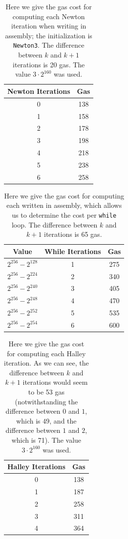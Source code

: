 \begin{table}[p]
\centering
\begin{tabular}{|c|S[table-format=3.0]|}
\hline
Newton Iterations & Gas \\
 & 138 \\
1 & 158 \\
2 & 178 \\
3 & 198 \\
4 & 218 \\
5 & 238 \\
6 & 258 \\
\hline
\end{tabular}
\caption[Newton Iteration Gas Costs]{Here we give
    the gas cost for computing each Newton iteration
    when writing in assembly;
    the initialization is \texttt{Newton3}.
    The difference between $k$ and $k+1$ iterations is 20 gas.
    The value $3\cdot2^{160}$ was used.
    }
\label{table:newton_iteration_gas_costs}
\end{table}

\begin{table}[p]
\centering
\begin{tabular}{|c|c|S[table-format=3.0]|}
\hline
Value & While Iterations & Gas \\
\hline
$2^{256} - 2^{128}$ & 1 & 275 \\
$2^{256} - 2^{224}$ & 2 & 340 \\
$2^{256} - 2^{240}$ & 3 & 405 \\
$2^{256} - 2^{248}$ & 4 & 470 \\
$2^{256} - 2^{252}$ & 5 & 535 \\
$2^{256} - 2^{254}$ & 6 & 600 \\
\hline
\end{tabular}
\caption[While Iteration Gas Costs]{Here we give
    the gas cost for computing each \WhileTwo{}
    written in assembly,
    which allows us to determine the cost per \texttt{while} loop.
    The difference between $k$ and $k+1$ iterations is 65 gas.
    }
\label{table:while_iteration_gas_costs}
\end{table}

\begin{table}[p]
\centering
\begin{tabular}{|c|S[table-format=3.0]|}
\hline
Halley Iterations & Gas \\
 & 138 \\
1 & 187 \\
2 & 258 \\
3 & 311 \\
4 & 364 \\
\hline
\end{tabular}
\caption[Halley Iteration Gas Costs]{Here we give
    the gas cost for computing each Halley iteration.
    As we can see, the difference between $k$ and $k+1$ iterations
    would seem to be 53 gas
    (notwithstanding the difference between $0$ and $1$,
    which is $49$, and the difference between $1$ and $2$, which is 71).
    The value $3\cdot2^{160}$ was used.
    }
\label{table:halley_iteration_gas_costs}
\end{table}

